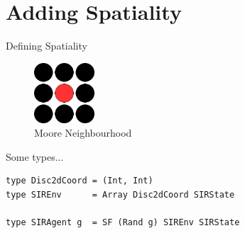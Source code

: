 \documentclass{beamer}
\begin{document}
\section{Adding Spatiality}
\begin{frame}[fragile]{Defining Spatiality}
\begin{figure}
\begin{center}
\includegraphics[width=0.2\textwidth]{./fig/moore.png}
\caption*{Moore Neighbourhood}
\end{center}
\end{figure}

\begin{block}{Some types...}
\begin{verbatim}
type Disc2dCoord = (Int, Int)
type SIREnv      = Array Disc2dCoord SIRState

type SIRAgent g  = SF (Rand g) SIREnv SIRState
\end{verbatim}
\end{block}
\end{frame}
\end{document}
